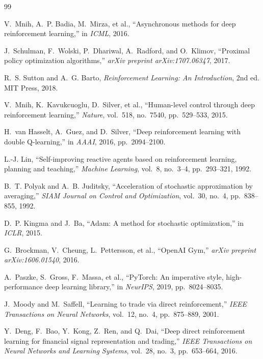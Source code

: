 \documentclass[11pt,twocolumn]{article}
\begin{document}
\begin{thebibliography}{99}

V.~Mnih, A.~P. Badia, M.~Mirza, et al.,
``Asynchronous methods for deep reinforcement learning,''
in \emph{ICML}, 2016.

J.~Schulman, F.~Wolski, P.~Dhariwal, A.~Radford, and O.~Klimov,
``Proximal policy optimization algorithms,''
\emph{arXiv preprint arXiv:1707.06347}, 2017.

R.~S. Sutton and A.~G. Barto, \emph{Reinforcement Learning: An Introduction}, 2nd ed. MIT Press, 2018.

V.~Mnih, K.~Kavukcuoglu, D.~Silver, et al., ``Human-level control through deep reinforcement learning,'' \emph{Nature}, vol.~518, no.~7540, pp.~529--533, 2015.

H.~van Hasselt, A.~Guez, and D.~Silver, ``Deep reinforcement learning with double Q-learning,'' in \emph{AAAI}, 2016, pp.~2094--2100.

L.-J. Lin, ``Self-improving reactive agents based on reinforcement learning, planning and teaching,'' \emph{Machine Learning}, vol.~8, no.~3--4, pp.~293--321, 1992.

B.~T. Polyak and A.~B. Juditsky, ``Acceleration of stochastic approximation by averaging,'' \emph{SIAM Journal on Control and Optimization}, vol.~30, no.~4, pp.~838--855, 1992.

D.~P. Kingma and J.~Ba, ``Adam: A method for stochastic optimization,'' in \emph{ICLR}, 2015.

G.~Brockman, V.~Cheung, L.~Pettersson, et al., ``OpenAI Gym,'' \emph{arXiv preprint arXiv:1606.01540}, 2016.

A.~Paszke, S.~Gross, F.~Massa, et al., ``PyTorch: An imperative style, high-performance deep learning library,'' in \emph{NeurIPS}, 2019, pp.~8024--8035.

J.~Moody and M.~Saffell, ``Learning to trade via direct reinforcement,'' \emph{IEEE Transactions on Neural Networks}, vol.~12, no.~4, pp.~875--889, 2001.

Y.~Deng, F.~Bao, Y.~Kong, Z.~Ren, and Q.~Dai, ``Deep direct reinforcement learning for financial signal representation and trading,'' \emph{IEEE Transactions on Neural Networks and Learning Systems}, vol.~28, no.~3, pp.~653--664, 2016.


\end{thebibliography}
\end{document}

